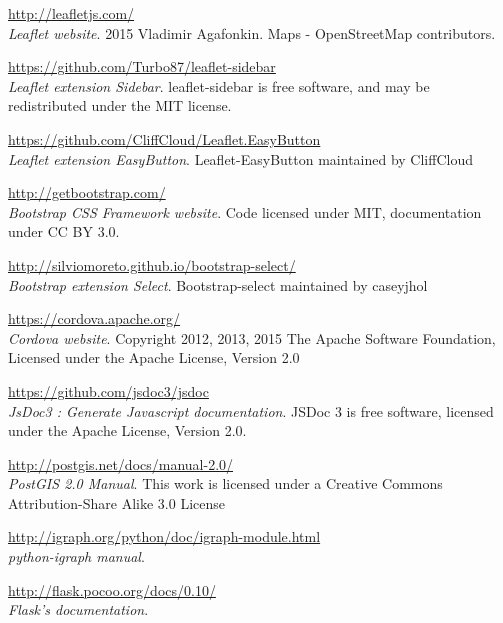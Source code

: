\begin{thebibliography}{ABC}

    \url{http://leafletjs.com/}\\
    \emph{Leaflet website}. 
    2015 Vladimir Agafonkin. Maps - OpenStreetMap contributors.

    \url{https://github.com/Turbo87/leaflet-sidebar}\\
    \emph{Leaflet extension Sidebar}. 
    leaflet-sidebar is free software, and may be redistributed under the MIT license.

    \url{https://github.com/CliffCloud/Leaflet.EasyButton}\\
    \emph{Leaflet extension EasyButton}. 
    Leaflet-EasyButton maintained by CliffCloud

    \url{http://getbootstrap.com/}\\
    \emph{Bootstrap CSS Framework website}.
    Code licensed under MIT, documentation under CC BY 3.0. 

    \url{http://silviomoreto.github.io/bootstrap-select/}\\
    \emph{Bootstrap extension Select}.
    Bootstrap-select maintained by caseyjhol 

    \url{https://cordova.apache.org/}\\
    \emph{Cordova website}.
    Copyright 2012, 2013, 2015 The Apache Software Foundation, Licensed under the Apache License, Version 2.0 

    \url{https://github.com/jsdoc3/jsdoc}\\
    \emph{JsDoc3 : Generate Javascript documentation}.
    JSDoc 3 is free software, licensed under the Apache License, Version 2.0. 
    
    \url{http://postgis.net/docs/manual-2.0/}\\
    \emph{PostGIS 2.0 Manual}.
    This work is licensed under a Creative Commons Attribution-Share Alike 3.0 License 
    
    \url{http://igraph.org/python/doc/igraph-module.html}\\
    \emph{python-igraph manual}.
    
    \url{http://flask.pocoo.org/docs/0.10/}\\
    \emph{Flask’s documentation}.


\end{thebibliography}